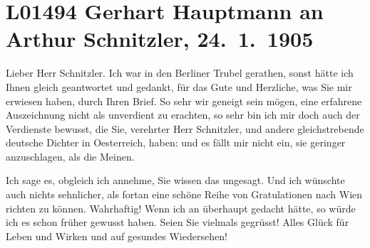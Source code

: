 

\section[Gerhart Hauptmann an Arthur Schnitzler, 24. 1. 1905]{L01494 Gerhart Hauptmann an Arthur Schnitzler, 24. 1. 1905}
\nopagebreak{}
\rehead{ }\normalsize\beginnumbering{}
\toendnotes[C]{\smallbreak\pagebreak[2]}
\toendnotes[C]{\smallbreak}
\toendnotes[C]{\smallbreak}
\pstart{}{\pb}Lieber Herr Schnitzler.\pend\vspace{0.5em}
\pstart
           Ich war in den Berliner Trubel gerathen, sonst
               hätte ich Ihnen gleich geantwortet und gedankt, für das Gute und Herzliche, was Sie
               mir erwiesen haben, durch Ihren Brief. So sehr wir geneigt sein mögen, eine erfahrene
               Auszeichnung nicht als unverdient zu erachten, so sehr bin ich mir doch auch der
               Verdienste bewusst, die Sie, verehrter Herr Schnitzler, und andere gleichstrebende
               deutsche Dichter in Oesterreich, haben: und es
               fällt mir nicht ein, sie geringer anzuschlagen, als die Meinen.\pend
           
\pstart
           Ich sage es, obgleich ich {\pb}annehme, Sie
               wissen das ungesagt. Und ich wünschte auch nichts sehnlicher, als fortan eine schöne
               Reihe von Gratulationen nach Wien richten zu
               können. Wahrhaftig! Wenn ich an \label{K_L01494-1v}\label{K_L01494-1}
               überhaupt gedacht hätte, so würde ich es schon früher gewusst haben. Seien Sie
               vielmals gegrüsst! Alles Glück für Leben und Wirken und auf gesundes Wiedersehen!\pend
           
